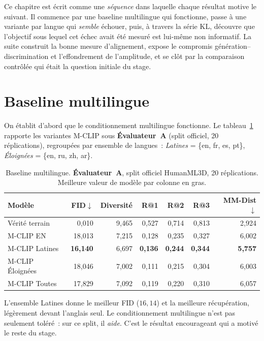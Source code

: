 \documentclass[12pt,a4paper,oneside]{report}
\theoremstyle{definition}
\theoremstyle{plain}
\begin{document}
Ce chapitre est écrit comme une \emph{séquence} dans laquelle chaque résultat
motive le suivant. Il commence par une baseline multilingue qui fonctionne, passe
à une variante par langue qui \emph{semble} échouer, puis, à travers la série KL,
découvre que l'objectif sous lequel cet échec avait été mesuré est lui-même non
informatif. La suite construit la bonne mesure d'alignement, expose le compromis
génération--discrimination et l'effondrement de l'amplitude, et se clôt par la
comparaison contrôlée qui était la question initiale du stage.

\section{Baseline multilingue}
\label{sec:baseline}

On établit d'abord que le conditionnement multilingue fonctionne. Le
tableau~\ref{tab:baseline} rapporte les variantes M-CLIP sous
\textbf{Évaluateur~A} (split officiel, 20 réplications), regroupées par ensemble
de langues~: \emph{Latines} = \{en, fr, es, pt\}, \emph{Éloignées} =
\{en, ru, zh, ar\}.

\begin{table}[ht]
\centering
\caption{Baseline multilingue. \textbf{Évaluateur~A}, split officiel HumanML3D,
20 réplications. Meilleure valeur de modèle par colonne en gras.}
\label{tab:baseline}
\small
\begin{tabular}{@{}lrrrrrr@{}}
\toprule
Modèle & FID$\downarrow$ & Diversité & R@1 & R@2 & R@3 & MM-Dist$\downarrow$ \\
\midrule
Vérité terrain   & 0,010  & 9,465 & 0,527 & 0,714 & 0,813 & 2,924 \\
\midrule
M-CLIP EN        & 18,013 & 7,215 & 0,128 & 0,235 & 0,327 & 6,002 \\
M-CLIP Latines   & \textbf{16,140} & 6,697 & \textbf{0,136} & \textbf{0,244} & \textbf{0,344} & \textbf{5,757} \\
M-CLIP Éloignées & 18,046 & 7,002 & 0,111 & 0,215 & 0,304 & 6,003 \\
M-CLIP Toutes    & 17,829 & 7,092 & 0,119 & 0,220 & 0,310 & 6,057 \\
\bottomrule
\end{tabular}
\end{table}

L'ensemble Latines donne le meilleur FID ($16{,}14$) et la meilleure récupération,
légèrement devant l'anglais seul. Le conditionnement multilingue n'est pas
seulement toléré~: sur ce split, il \emph{aide}. C'est le résultat encourageant
qui a motivé le reste du stage.
\end{document}

